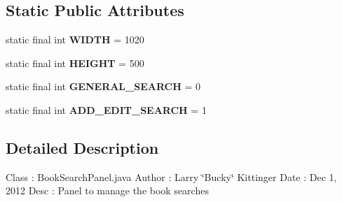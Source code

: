 \subsection*{Static Public Attributes}
\begin{DoxyCompactItemize}
\item 
\hypertarget{classw3se_1_1_view_1_1_panels_1_1_book_search_panel_a40f43ee287e72e3af30be793169eddcb}{static final int {\bfseries W\-I\-D\-T\-H} = 1020}\label{classw3se_1_1_view_1_1_panels_1_1_book_search_panel_a40f43ee287e72e3af30be793169eddcb}

\item 
\hypertarget{classw3se_1_1_view_1_1_panels_1_1_book_search_panel_a1502f8806d53bf44680726ed2d3a81dc}{static final int {\bfseries H\-E\-I\-G\-H\-T} = 500}\label{classw3se_1_1_view_1_1_panels_1_1_book_search_panel_a1502f8806d53bf44680726ed2d3a81dc}

\item 
\hypertarget{classw3se_1_1_view_1_1_panels_1_1_book_search_panel_a4460547f449ee160dba1ea17a6c1225a}{static final int {\bfseries G\-E\-N\-E\-R\-A\-L\-\_\-\-S\-E\-A\-R\-C\-H} = 0}\label{classw3se_1_1_view_1_1_panels_1_1_book_search_panel_a4460547f449ee160dba1ea17a6c1225a}

\item 
\hypertarget{classw3se_1_1_view_1_1_panels_1_1_book_search_panel_a9b930a74bd3f8a10c86d04d43998e51f}{static final int {\bfseries A\-D\-D\-\_\-\-E\-D\-I\-T\-\_\-\-S\-E\-A\-R\-C\-H} = 1}\label{classw3se_1_1_view_1_1_panels_1_1_book_search_panel_a9b930a74bd3f8a10c86d04d43998e51f}

\end{DoxyCompactItemize}


\subsection{Detailed Description}
Class \-: Book\-Search\-Panel.\-java Author \-: Larry \char`\"{}\-Bucky\char`\"{} Kittinger Date \-: Dec 1, 2012 Desc \-: Panel to manage the book searches 

